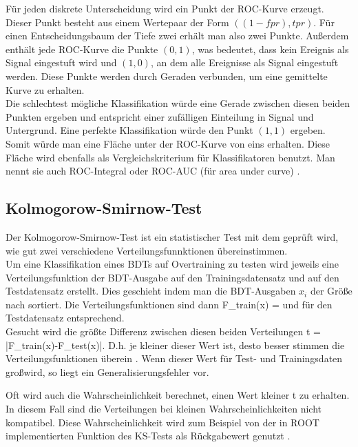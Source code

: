 F\"ur jeden diskrete Unterscheidung wird ein Punkt der ROC-Kurve erzeugt. Dieser Punkt besteht aus einem Wertepaar der Form $((1-fpr),tpr)$. F\"ur einen Entscheidungsbaum der Tiefe zwei erh\"alt man also zwei Punkte. Au\ss erdem enth\"alt jede ROC-Kurve die Punkte $(0,1)$, was bedeutet, dass kein Ereignis als Signal eingestuft wird und $(1,0)$, an dem alle Ereignisse als Signal eingestuft werden. Diese Punkte werden durch Geraden verbunden, um eine gemittelte Kurve zu erhalten.\\
Die schlechtest m\"ogliche Klassifikation w\"urde eine Gerade zwischen diesen beiden Punkten ergeben und entspricht einer zuf\"alligen Einteilung in Signal und Untergrund. Eine perfekte Klassifikation w\"urde den Punkt $(1,1)$ ergeben. Somit w\"urde man eine Fl\"ache unter der ROC-Kurve von eins erhalten. Diese Fl\"ache wird ebenfalls als Vergleichskriterium f\"ur Klassifikatoren benutzt. Man nennt sie auch ROC-Integral oder ROC-AUC (f\"ur area under curve) \cite{ROC_Graphs}.

\subsection{Kolmogorow-Smirnow-Test}
\label{ch:Vergleich:subsec:KSTest}

Der Kolmogorow-Smirnow-Test ist ein statistischer Test mit dem gepr\"uft wird, wie gut zwei verschiedene Verteilungsfunnktionen \"ubereinstimmen.\\
Um eine Klassifikation eines BDTs auf Overtraining zu testen wird jeweils eine Verteilungsfunktion der BDT-Ausgabe auf den Trainingsdatensatz und auf den Testdatensatz erstellt. Dies geschieht indem man die BDT-Ausgaben $x_i$ der Gr\"o\ss e nach sortiert. Die Verteilungsfunktionen sind dann
\beq
F_{train}(x) = 
\label{eq:CDF_train}
\eeq
und f\"ur den Testdatensatz entsprechend.\\
Gesucht wird die gr\"o\ss te Differenz zwischen diesen beiden Verteilungen
\beq
t = \cdot\max\left|F_{train}(x)-F_{test}(x)\right|.
\label{eq:KSTest}
\eeq
D.h. je kleiner dieser Wert ist, desto besser stimmen die Verteilungsfunktionen \"uberein \cite{Blobel}. Wenn dieser Wert f\"ur Test- und Trainingsdaten gro\ss  wird, so liegt ein Generalisierungsfehler vor.

Oft wird auch die Wahrscheinlichkeit berechnet, einen Wert kleiner t zu erhalten. In diesem Fall sind die Verteilungen bei kleinen Wahrscheinlichkeiten nicht kompatibel. Diese Wahrscheinlichkeit wird zum Beispiel von der in ROOT implementierten Funktion des KS-Tests als R\"uckgabewert genutzt \cite{ROOT:TH1F}.

